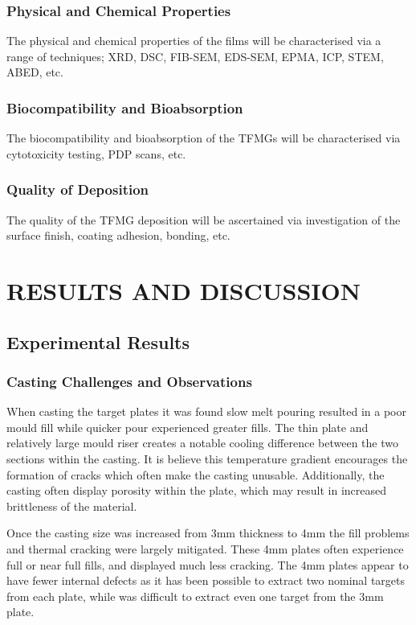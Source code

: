 \documentclass[draft,a4paper,12pt,oneside]{report}%
\begin{document}
\subsection{Physical and Chemical Properties}
The physical and chemical properties of the films will be characterised via a range of techniques; XRD, DSC, FIB-SEM, EDS-SEM, EPMA, ICP, STEM, ABED, etc. 

\subsection{Biocompatibility and Bioabsorption} 
The biocompatibility and bioabsorption of the TFMGs will be characterised via cytotoxicity testing, PDP scans, etc.  

\subsection{Quality of Deposition} 
The quality of the TFMG deposition will be ascertained via investigation of the surface finish, coating adhesion, bonding, etc.

\chapter{RESULTS AND DISCUSSION}
\glsresetall

\section{Experimental Results} 
\subsection{Casting Challenges and Observations}
When casting the target plates it was found slow melt pouring resulted in a poor mould fill while quicker pour experienced greater fills. The thin plate and relatively large mould riser creates a notable cooling difference between the two sections within the casting. It is believe this temperature gradient encourages the formation of cracks which often make the casting unusable. Additionally, the casting often display porosity within the plate, which may result in increased brittleness of the material. 

Once the casting size was increased from 3mm thickness to 4mm the fill problems and thermal cracking were largely mitigated. These 4mm plates often experience full or near full fills, and displayed much less cracking. The 4mm plates appear to have fewer internal defects as it has been possible to extract two nominal targets from each plate, while was difficult to extract even one target from the 3mm plate. 
\end{document}
